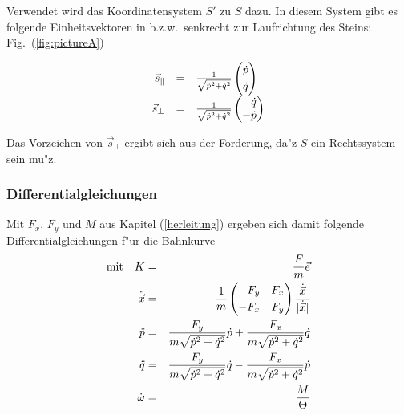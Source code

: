 \documentclass[a4paper]{report}
\newcommand{\eqlab}[1]{\label{eq:#1}}
\newcommand{\figref}[1]{Fig.~(\ref{fig:#1})}
\newcommand{\NONUMBER}{\nonumber}
\newcommand{\NONUMBER}{}
\begin{document}
Verwendet wird das Koordinatensystem $ S' $ zu $ S $ dazu. In diesem System gibt es
folgende Einheitsvektoren in b.z.w.\ senkrecht zur Laufrichtung des Steins:
\figref{pictureA} %
%
\iftrue
\begin{equation}
\begin{array}{rcl}
\vec{s}_\parallel &=& \frac{1}{\sqrt{ \dot{p}^2 + \dot{q}^2 }}
    \left( \begin{array}{@{}c@{}}\dot{p} \\[\jot] \dot{q} \end{array} \right) \\[3\jot]
%
\vec{s}_\perp &=& \frac{1}{\sqrt{ \dot{p}^2 + \dot{q}^2 }}
    \left( \begin{array}{@{}r@{}} \dot{q} \\ -\dot{p} \end{array}\right)
\end{array}
\end{equation}
\else
\begin{eqnarray}
\vec{s}_\parallel &=& \frac{ 1 }{ \sqrt{ \dot{p}^2 + \dot{q}^2 } }
    \left(\begin{array}{@{}r@{}} \dot{p} \\[\jot] \dot{q} \end{array} \right) \\
%
\vec{s}_\perp &=& \frac{ 1 }{ \sqrt{ \dot{p}^2 + \dot{q}^2 } }
    \left(\begin{array}{@{}r@{}} \dot{q} \\[\jot] -\dot{p} \end{array} \right)
\end{eqnarray}
\fi

Das Vorzeichen von $ \vec{s}_\perp $ ergibt sich aus der Forderung, da"z $ S $ ein
Rechtssystem sein mu"z.

\subsubsection{Differentialgleichungen}

Mit $ F_x $, $ F_y $ und $ M $ aus Kapitel (\ref{herleitung}) ergeben sich
damit folgende Differentialgleichungen f"ur die Bahnkurve
%
\begin{eqnarray}
\textrm{mit}\quad K &=& \frac{F}{m}\vec{e}	\\
\ddot{\vec{x}} &=& \frac{ 1 }{ m }
    \left( \begin{array}{@{}rr@{}}
         F_y & F_x \\[\jot]
        -F_x & F_y
    \end{array} \right)
    \frac{ \dot{\vec{x}} }{ |\dot{\vec{x}}| } \NONUMBER\\
%
\ddot{p} &=& \frac{F_y}{m \sqrt{\dot{p}^2+\dot{q}^2}} \dot{p} +
	     \frac{F_x}{m \sqrt{\dot{p}^2+\dot{q}^2}} \dot{q}
	\eqlab{diff-p}\\
\ddot{q} &=& \frac{F_y}{m \sqrt{\dot{p}^2+\dot{q}^2}} \dot{q} -
	     \frac{F_x}{m \sqrt{\dot{p}^2+\dot{q}^2}} \dot{p}
	\eqlab{diff-q}\\
\dot{\omega} &=& \frac{M}{\Theta}
	\eqlab{diff-w}
\end{eqnarray}
\end{document}
